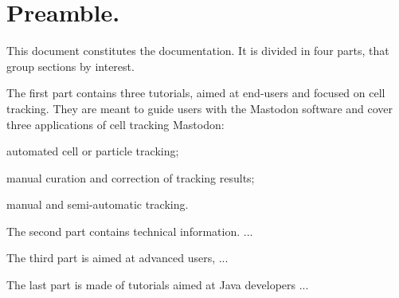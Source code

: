 \section*{Preamble.}

This document constitutes the  documentation. 
It is divided in four parts, that group sections by interest.
\begin{myitemize}
	
	\item The first part contains three tutorials, aimed at end-users and focused on cell tracking.
	They are meant to guide users with the Mastodon software and cover three applications of cell tracking Mastodon:
	\begin{myitemize}
		\item automated cell or particle tracking;
		\item manual curation and correction of tracking results;
		\item manual and semi-automatic tracking.
	\end{myitemize}
	
	\item The second part contains technical information. ...
	
	\item The third part is aimed at advanced users, ...
	
	\item The last part is made of tutorials aimed at Java developers ...
	
\end{myitemize}
